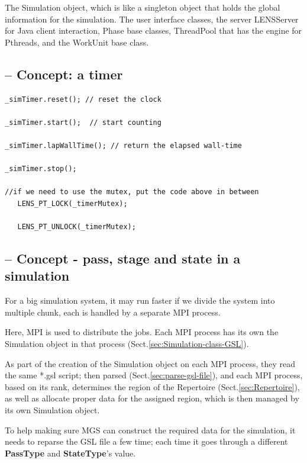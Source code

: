 The Simulation object, which is like a singleton object that holds the
global information for the simulation.  The user interface classes, the server
LENSServer for Java client interaction, Phase base classes, ThreadPool that has
the engine for Pthreads, and the WorkUnit base class.
  

\subsection{-- Concept: a timer}
\label{sec:Timer}

\begin{lstlisting}
_simTimer.reset(); // reset the clock

_simTimer.start();  // start counting

_simTimer.lapWallTime(); // return the elapsed wall-time

_simTimer.stop();

//if we need to use the mutex, put the code above in between       
   LENS_PT_LOCK(_timerMutex);              
                                                                      
   LENS_PT_UNLOCK(_timerMutex);              
\end{lstlisting}



\subsection{-- Concept - pass, stage and state in a simulation}
\label{sec:gslparser-pass-and-state}
\label{sec:pass-gslparser}
\label{sec:stage-gslparser}
\label{sec:state-gslparser}

For a big simulation system, it may run faster if we divide the system into
multiple chunk, each is handled by a separate MPI process.

Here, MPI is used to distribute the jobs. Each MPI process has its own the
Simulation object in that process (Sect.\ref{sec:Simulation-class-GSL}).

As part of the creation of the Simulation object on each MPI process, they read
the same *.gsl script; then parsed (Sect.\ref{sec:parse-gsl-file}), and each MPI
process, based on its rank, determines the region of the Repertoire
(Sect.\ref{sec:Repertoire}), as well as allocate proper data for the assigned
region, which is then managed by its own Simulation object.

To help making sure MGS can construct the required data for the simulation, it
needs to reparse the GSL file a few time; each time it goes through a different
{\bf PassType} and {\bf StateType}'s value. 

